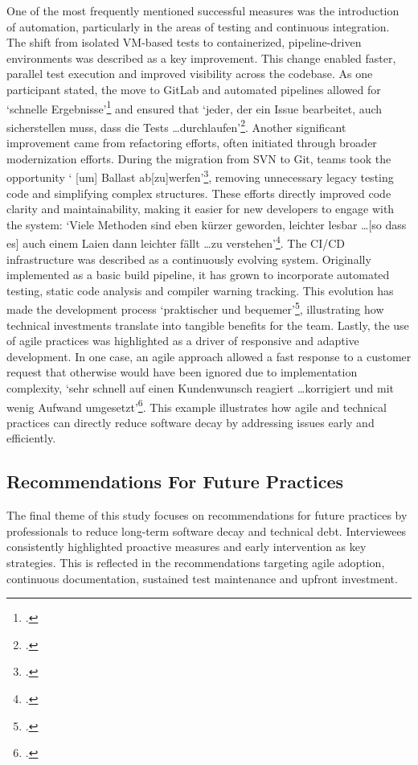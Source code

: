 One of the most frequently mentioned successful measures was the introduction of automation, particularly in the areas of testing and continuous integration. The shift from isolated VM-based tests to containerized, pipeline-driven environments was described as a key improvement. This change enabled faster, parallel test execution
and improved visibility across the codebase. As one participant stated, the move to GitLab and automated pipelines allowed for `schnelle Ergebnisse'\footcite[77]{Interview32025} and ensured that `jeder, der ein Issue bearbeitet, auch sicherstellen muss, dass die Tests \ldots durchlaufen'\footcite[77]{Interview32025}.
Another significant improvement came from refactoring efforts, often initiated through broader modernization efforts. During the migration from SVN to Git, teams took the opportunity ` [um] Ballast ab[zu]werfen'\footcite[78]{Interview32025}, removing unnecessary legacy testing code and simplifying complex structures. These efforts directly improved code clarity and maintainability,
making it easier for new developers to engage with the system: `Viele Methoden sind eben kürzer geworden, leichter lesbar \ldots [so dass es] auch einem Laien dann leichter fällt \ldots zu verstehen'\footcite[73]{Interview22025}.
The CI/CD infrastructure was described as a continuously evolving system. Originally implemented as a basic build pipeline, it has grown to incorporate automated testing, static code analysis and compiler warning tracking. This evolution has made the development process `praktischer und bequemer'\footcite[72]{Interview22025}, illustrating how technical
investments translate into tangible benefits for the team.
Lastly, the use of agile practices was highlighted as a driver of responsive and adaptive development. In one case, an agile approach allowed a fast response to a customer request that otherwise would have been ignored due to implementation complexity, `sehr schnell auf einen Kundenwunsch reagiert \ldots korrigiert und mit wenig Aufwand umgesetzt'\footcite[84]{Interview32025}.
This example illustrates how agile and technical practices can directly reduce software decay by addressing issues early and efficiently.

\subsection{Recommendations For Future Practices}
The final theme of this study focuses on recommendations for future practices by professionals to reduce long-term software decay and technical debt. Interviewees consistently highlighted proactive measures and early intervention as key strategies. This is reflected in the recommendations targeting agile adoption, continuous documentation, sustained test maintenance and upfront investment.

